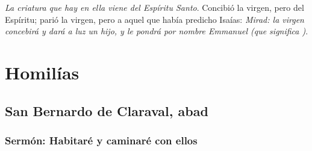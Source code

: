 \begin{body}
	\emph{La criatura que hay en ella viene del Espíritu Santo}. Concibió la virgen, pero del Espíritu; parió la virgen, pero a aquel que había predicho Isaías: \emph{Mirad: la virgen concebirá y dará a luz un hijo, y le pondrá por nombre Emmanuel (que significa )}.
\end{body}

\newsection

\section{Homilías}

\homiliasNavidad

\subsection{San Bernardo de Claraval, abad}

\subsubsection{Sermón: Habitaré y caminaré con ellos}


